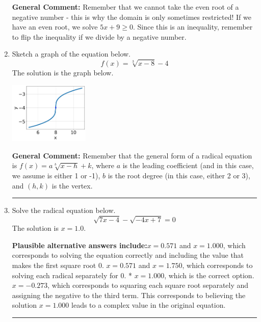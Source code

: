 \documentclass{extbook}[14pt]
\newcommand{\litem}[1]{\item #1

\rule{\textwidth}{0.4pt}}
\begin{document}
\begin{enumerate}
{\textbf{General Comment:} Remember that we cannot take the even root of a negative number - this is why the domain is only sometimes restricted! If we have an even root, we solve $5 x + 9 \geq 0$. Since this is an inequality, remember to flip the inequality if we divide by a negative number.
}
\litem{
Sketch a graph of the equation below.
\[ f(x) = \sqrt[3]{x - 8} - 4 \]The solution is the graph below.
    \begin{center}
        \includegraphics[width=0.3\textwidth]{../Figures/radicalEquationToGraphAB.png}
    \end{center}

\textbf{General Comment:} Remember that the general form of a radical equation is $ f(x) = a \sqrt[b]{x - h} + k $, where $a$ is the leading coefficient (and in this case, we assume is either 1 or -1), $b$ is the root degree (in this case, either 2 or 3), and $(h, k)$ is the vertex.
}
\litem{
Solve the radical equation below.
\[ \sqrt{7 x - 4} - \sqrt{-4 x + 7} = 0 \]The solution is \( x = 1.0 \).\begin{enumerate}[label=\Alph*.]
\textbf{Plausible alternative answers include:}$x = 0.571$ and $x = 1.000$, which corresponds to solving the equation correctly and including the value that makes the first square root 0.
$x = 0.571$ and $x = 1.750$, which corresponds to solving each radical separately for 0.
* $x = 1.000$, which is the correct option.
$x = -0.273$, which corresponds to squaring each square root separately and assigning the negative to the third term.
This corresponds to believing the solution $x = 1.000$ leads to a complex value in the original equation.
\end{enumerate}

}
\end{enumerate}
\end{document}
